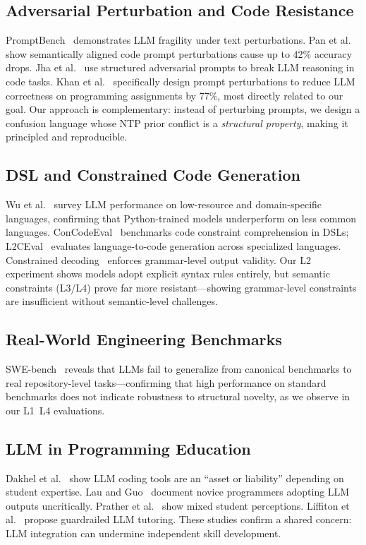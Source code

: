 \subsection{Adversarial Perturbation and Code Resistance}
PromptBench~\cite{zhu2023promptrobust} demonstrates LLM fragility under text perturbations. Pan et al.~\cite{pan2024adversarial} show semantically aligned code prompt perturbations cause up to 42\% accuracy drops. Jha et al.~\cite{coderobbery2024} use structured adversarial prompts to break LLM reasoning in code tasks. Khan et al.~\cite{khan2024cheatingllm} specifically design prompt perturbations to reduce LLM correctness on programming assignments by 77\%, most directly related to our goal. Our approach is complementary: instead of perturbing prompts, we design a confusion language whose NTP prior conflict is a \emph{structural property}, making it principled and reproducible.

\subsection{DSL and Constrained Code Generation}
Wu et al.~\cite{wu2024lowresource} survey LLM performance on low-resource and domain-specific languages, confirming that Python-trained models underperform on less common languages. ConCodeEval~\cite{concode2024} benchmarks code constraint comprehension in DSLs; L2CEval~\cite{l2ceval2024} evaluates language-to-code generation across specialized languages. Constrained decoding~\cite{dong2024xgrammar,muendler2025type} enforces grammar-level output validity. Our L2 experiment shows models adopt explicit syntax rules entirely, but semantic constraints (L3/L4) prove far more resistant---showing grammar-level constraints are insufficient without semantic-level challenges.

\subsection{Real-World Engineering Benchmarks}
SWE-bench~\cite{jimenez2024swebench} reveals that LLMs fail to generalize from canonical benchmarks to real repository-level tasks---confirming that high performance on standard benchmarks does not indicate robustness to structural novelty, as we observe in our L1~L4 evaluations.

\subsection{LLM in Programming Education}
Dakhel et al.~\cite{dakhel2023github} show LLM coding tools are an ``asset or liability'' depending on student expertise. Lau and Guo~\cite{lau2023learners} document novice programmers adopting LLM outputs uncritically. Prather et al.~\cite{prather2023robots} show mixed student perceptions. Liffiton et al.~\cite{liffiton2023codehelp} propose guardrailed LLM tutoring. These studies confirm a shared concern: LLM integration can undermine independent skill development.

